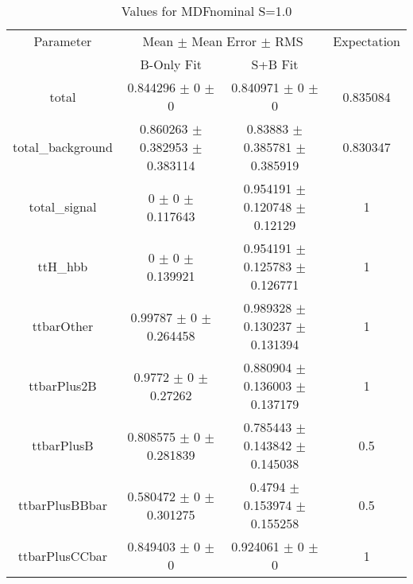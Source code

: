 \begin{table}
\centering
\caption{Values for MDFnominal S=1.0}
\begin{tabular}{cccc}
\toprule
Parameter & \multicolumn{2}{c}{Mean $\pm$ Mean Error $\pm$ RMS} & Expectation\\
 & B-Only Fit & S+B Fit & \\
\midrule
total & \num{0.844296} $\pm$ \num{0} $\pm$ \num{0} & \num{0.840971} $\pm$ \num{0} $\pm$ \num{0} & \num{0.835084}\\
total\_background & \num{0.860263} $\pm$ \num{0.382953} $\pm$ \num{0.383114} & \num{0.83883} $\pm$ \num{0.385781} $\pm$ \num{0.385919} & \num{0.830347}\\
total\_signal & \num{0} $\pm$ \num{0} $\pm$ \num{0.117643} & \num{0.954191} $\pm$ \num{0.120748} $\pm$ \num{0.12129} & \num{1}\\
ttH\_hbb & \num{0} $\pm$ \num{0} $\pm$ \num{0.139921} & \num{0.954191} $\pm$ \num{0.125783} $\pm$ \num{0.126771} & \num{1}\\
ttbarOther & \num{0.99787} $\pm$ \num{0} $\pm$ \num{0.264458} & \num{0.989328} $\pm$ \num{0.130237} $\pm$ \num{0.131394} & \num{1}\\
ttbarPlus2B & \num{0.9772} $\pm$ \num{0} $\pm$ \num{0.27262} & \num{0.880904} $\pm$ \num{0.136003} $\pm$ \num{0.137179} & \num{1}\\
ttbarPlusB & \num{0.808575} $\pm$ \num{0} $\pm$ \num{0.281839} & \num{0.785443} $\pm$ \num{0.143842} $\pm$ \num{0.145038} & \num{0.5}\\
ttbarPlusBBbar & \num{0.580472} $\pm$ \num{0} $\pm$ \num{0.301275} & \num{0.4794} $\pm$ \num{0.153974} $\pm$ \num{0.155258} & \num{0.5}\\
ttbarPlusCCbar & \num{0.849403} $\pm$ \num{0} $\pm$ \num{0} & \num{0.924061} $\pm$ \num{0} $\pm$ \num{0} & \num{1}\\
\bottomrule
\end{tabular}
\end{table}